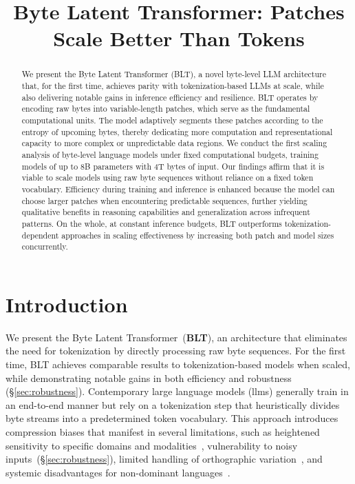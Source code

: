 \title{Byte Latent Transformer: Patches Scale Better Than Tokens}

\begin{abstract}
We present the Byte Latent Transformer ({\textsc BLT}), a novel byte-level LLM architecture that, for the first time, achieves parity with tokenization-based LLMs at scale, while also delivering notable gains in inference efficiency and resilience. {\textsc BLT} operates by encoding raw bytes into variable-length patches, which serve as the fundamental computational units. The model adaptively segments these patches according to the entropy of upcoming bytes, thereby dedicating more computation and representational capacity to more complex or unpredictable data regions. We conduct the first scaling analysis of byte-level language models under fixed computational budgets, training models of up to 8B parameters with 4T bytes of input. Our findings affirm that it is viable to scale models using raw byte sequences without reliance on a fixed token vocabulary. Efficiency during training and inference is enhanced because the model can choose larger patches when encountering predictable sequences, further yielding qualitative benefits in reasoning capabilities and generalization across infrequent patterns. On the whole, at constant inference budgets, {\textsc BLT} outperforms tokenization-dependent approaches in scaling effectiveness by increasing both patch and model sizes concurrently.
\end{abstract}

\section{Introduction}
\label{section:intro}

We present the Byte Latent Transformer~(\textbf{BLT}), an architecture that eliminates the need for tokenization by directly processing raw byte sequences. For the first time, BLT achieves comparable results to tokenization-based models when scaled, while demonstrating notable gains in both efficiency and robustness (\S\ref{sec:robustness}). Contemporary large language models (llms) generally train in an end-to-end manner but rely on a tokenization step that heuristically divides byte streams into a predetermined token vocabulary. This approach introduces compression biases that manifest in several limitations, such as heightened sensitivity to specific domains and modalities~\citep{dagangetting}, vulnerability to noisy inputs~(\S\ref{sec:robustness}), limited handling of orthographic variation~\citep{edman2024cute}, and systemic disadvantages for non-dominant languages~\citep{liang2023xlm,petrov2024language,limisiewicz2024myte}.

